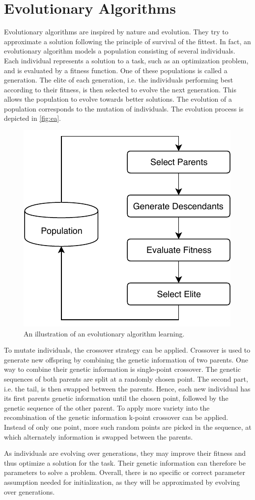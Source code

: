 \section{Evolutionary Algorithms}
\label{sec:ea}
Evolutionary algorithms are inspired by nature and evolution.
They try to approximate a solution following the principle of survival of the fittest.
In fact, an evolutionary algorithm models a population consisting of several individuals.
Each individual represents a solution to a task, such as an optimization problem, and is evaluated by a fitness function.
One of these populations is called a generation.
The elite of each generation, i.e. the individuals performing best according to their fitness, is then selected to evolve the next generation.
This allows the population to evolve towards better solutions.
The evolution of a population corresponds to the mutation of individuals.
The evolution process is depicted in \autoref{fig:ea}.

\begin{figure}[h]
\centering
\includegraphics[width=.7\columnwidth]{figures/ea_fig.pdf}
\caption{An illustration of an evolutionary algorithm learning. \cite{Dillmann2017}}
\label{fig:ea}
\end{figure}

To mutate individuals, the crossover strategy can be applied.
Crossover is used to generate new offspring by combining the genetic information of two parents.
One way to combine their genetic information is single-point crossover.
The genetic sequences of both parents are split at a randomly chosen point.
The second part, i.e. the tail, is then swapped between the parents.
Hence, each new individual has its first parents genetic information until the chosen point, followed by the genetic sequence of the other parent.
To apply more variety into the recombination of the genetic information k-point crossover can be applied.
Instead of only one point, more such random points are picked in the sequence, at which alternately information is swapped between the parents.
\cite{Dillmann2017}

As individuals are evolving over generations, they may improve their fitness and thus optimize a solution for the task.
Their genetic information can therefore be parameters to solve a problem.
Overall, there is no specific or correct parameter assumption needed for initialization, as they will be approximated by evolving over generations.
